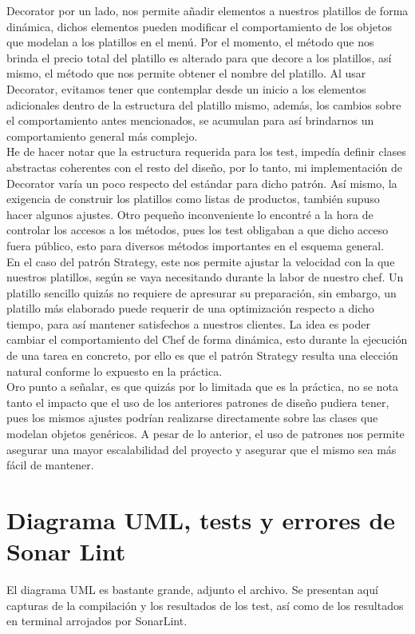 \documentclass{article}
\begin{document}
Decorator por un lado, nos permite añadir elementos a nuestros platillos de forma dinámica, dichos elementos pueden modificar el comportamiento de los objetos que modelan a los platillos en el menú. Por el momento, el método que nos brinda el precio total del platillo es alterado para que decore a los platillos, así mismo, el método que nos permite obtener el nombre del platillo. Al usar Decorator, evitamos tener que contemplar desde  un inicio a los elementos adicionales dentro de la estructura del platillo mismo, además, los cambios sobre el comportamiento antes mencionados, se acumulan para así brindarnos un comportamiento general más complejo.\\

He de hacer notar que la estructura requerida para los test, impedía definir clases abstractas coherentes con el resto del diseño, por lo tanto, mi implementación de Decorator varía un poco respecto del estándar para dicho patrón. Así mismo, la exigencia de construir los platillos como listas de productos, también supuso hacer algunos ajustes. Otro pequeño inconveniente lo encontré a la hora de controlar los accesos a los métodos, pues los test obligaban a que dicho acceso fuera público, esto para diversos métodos importantes en el esquema general.\\ 

En el caso del patrón Strategy, este nos permite ajustar la velocidad con la que  nuestros platillos, según se vaya necesitando durante la labor de nuestro chef. Un platillo sencillo quizás no requiere de apresurar su preparación, sin embargo, un platillo más elaborado puede requerir de una optimización respecto a dicho tiempo, para así mantener satisfechos a nuestros clientes. La idea es poder cambiar el comportamiento del Chef de forma dinámica, esto durante la ejecución de una tarea en concreto, por ello es que el patrón Strategy resulta una elección natural conforme lo expuesto en la práctica.\\ 

Oro punto a señalar, es que quizás por lo limitada que es la práctica, no se nota tanto el impacto que el uso de los anteriores patrones de diseño pudiera tener, pues los mismos ajustes podrían realizarse directamente sobre las clases que modelan objetos genéricos. A pesar de lo anterior, el uso de patrones nos permite asegurar una mayor escalabilidad del proyecto y asegurar que el mismo sea más fácil de mantener. 

\section*{Diagrama UML, tests y errores de Sonar Lint}
El diagrama UML es bastante grande, adjunto el archivo. Se presentan aquí capturas de la compilación y los resultados de los test, así como de los resultados en terminal arrojados por SonarLint.
\end{document}
